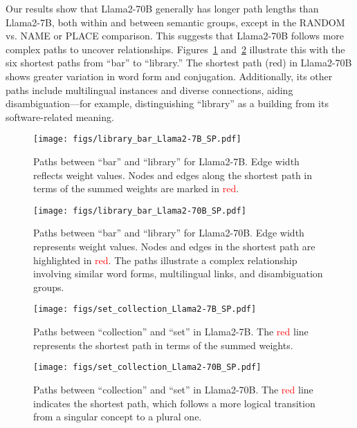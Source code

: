 Our results show that Llama2-70B generally has longer path lengths than Llama2-7B, both within and between semantic groups, except in the RANDOM vs. NAME or PLACE comparison. This suggests that Llama2-70B follows more complex paths to uncover relationships. Figures~\ref{fig:example_7B} and~\ref{fig:example_70B} illustrate this with the six shortest paths from “bar” to “library.” The shortest path (red) in Llama2-70B shows greater variation in word form and conjugation. Additionally, its other paths include multilingual instances and diverse connections, aiding disambiguation—for example, distinguishing “library” as a building from its software-related meaning.

\begin{figure}
    \centering
    \texttt{[image: figs/library\_bar\_Llama2-7B\_SP.pdf]}
    \caption{Paths between ``bar'' and ``library'' for Llama2-7B. Edge width reflects weight values. Nodes and edges along the shortest path in terms of the summed weights are marked in \textcolor{red}{red}.}
    \label{fig:example_7B}
\end{figure}

\begin{figure}
    \centering
    \texttt{[image: figs/library\_bar\_Llama2-70B\_SP.pdf]}
    \caption{Paths between ``bar'' and ``library'' for Llama2-70B. Edge width represents weight values. Nodes and edges in the shortest path are highlighted in \textcolor{red}{red}. The paths illustrate a complex relationship involving similar word forms, multilingual links, and disambiguation groups.}
    \label{fig:example_70B}
\end{figure}

\begin{figure}[h]
    \centering
    \texttt{[image: figs/set\_collection\_Llama2-7B\_SP.pdf]}
    \caption{Paths between ``collection'' and ``set'' in Llama2-7B. The \textcolor{red}{red} line represents the shortest path in terms of the summed weights.}
    \label{fig:example_hyp_7B}
\end{figure}

\begin{figure}[h]
    \centering
    \texttt{[image: figs/set\_collection\_Llama2-70B\_SP.pdf]}
    \caption{Paths between ``collection'' and ``set'' in Llama2-70B. The \textcolor{red}{red} line indicates the shortest path, which follows a more logical transition from a singular concept to a plural one.}
    \label{fig:example_hyp_70B}
\end{figure}

